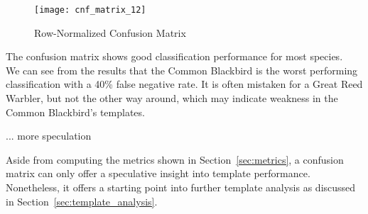 \begin{figure}[!htb]
  \centering
  \texttt{[image: cnf\_matrix\_12]}
  \caption{Row-Normalized Confusion Matrix}\label{fig:cnf12}
\end{figure}

The confusion matrix shows good classification performance for most species.\\

We can see from the results that the Common Blackbird is the worst performing
classification with a 40\% false negative rate.
It is often mistaken for a Great Reed Warbler, but not the other way around,
which may indicate weakness in the Common Blackbird's templates.

... more speculation

Aside from computing the metrics shown in Section~\ref{sec:metrics}, a confusion
matrix can only offer a speculative insight into template performance.
Nonetheless, it offers a starting point into further template analysis as
discussed in Section~\ref{sec:template_analysis}.

